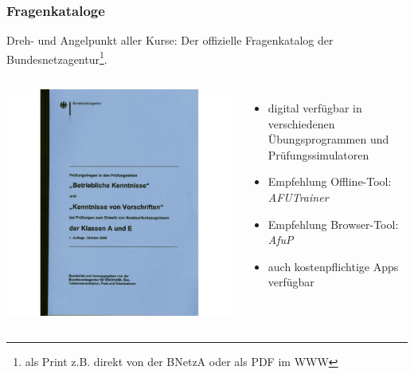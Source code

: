 \begin{frame}
    \frametitle{Fragenkataloge}

    Dreh- und Angelpunkt aller Kurse: Der offizielle Fragenkatalog der
    Bundesnetzagentur\footnote{als Print z.B. direkt von der BNetzA oder als PDF im WWW}.

    \begin{columns}[c]
        \column[c]{3cm}
        \begin{center}
            \includegraphics[height=0.6\textheight]{e00/Fragenkatalog-Klasse-A-und-E-Betriebliche-Kenntnisse-und-Kenntnisse-von-Vorschriften.jpg}
            \tiny \hyperlink{refs}{\cite{darcv}}
        \end{center}
        \column{7cm}
        \begin{itemize}
            \item digital verfügbar in verschiedenen Übungsprogrammen und
            Prüfungssimulatoren
            \item Empfehlung Offline-Tool: \emph{AFUTrainer}\hyperlink{refs}{\cite{afut}}
            \item Empfehlung Browser-Tool: \emph{AfuP}\hyperlink{refs}{\cite{afup}}
            \item auch kostenpflichtige Apps verfügbar
        \end{itemize}
    \end{columns}

\end{frame}

